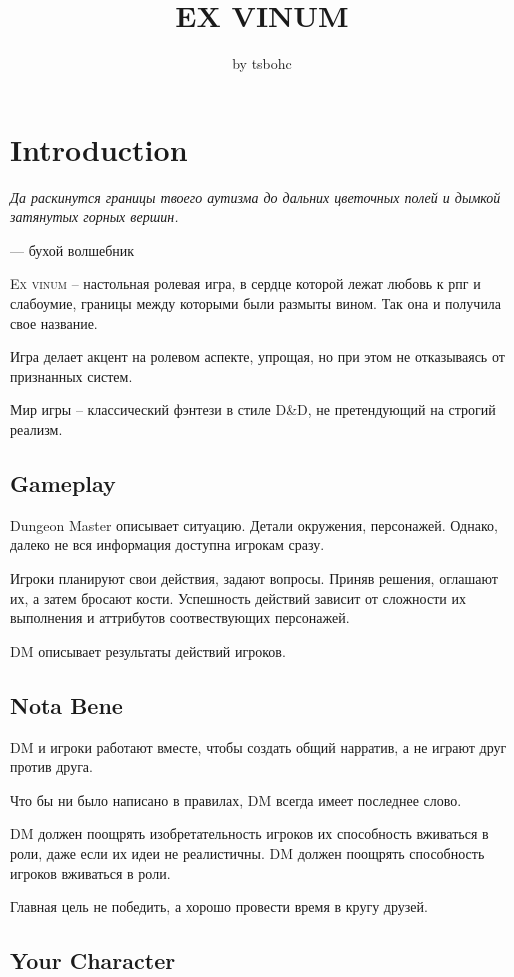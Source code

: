 \documentclass[a4paper,12pt,twocolumn]{book}
\title{\textbf{EX VINUM}}
\author{by tsbohc}
\date{}
\begin{document}
\maketitle
\tableofcontents

\chapter{Introduction}
\epigraph{\emph{Да раскинутся границы твоего аутизма до дальних цветочных полей и дымкой затянутых горных вершин.}}{--- бухой волшебник}

\lettrine{E}{x vinum} -- настольная ролевая игра, в сердце которой лежат любовь к рпг и слабоумие, границы между которыми были размыты вином. Так она и получила свое название.

Игра делает акцент на ролевом аспекте, упрощая, но при этом не отказываясь от признанных систем.

Мир игры -- классический фэнтези в стиле D\&D, не претендующий на строгий реализм.

\section{Gameplay}
Dungeon Master описывает ситуацию. Детали окружения, персонажей. Однако, далеко не вся информация доступна игрокам сразу.

Игроки планируют свои действия, задают вопросы. Приняв решения, оглашают их, а затем бросают кости. Успешность действий зависит от сложности их выполнения и аттрибутов соотвествующих персонажей.

DM описывает результаты действий игроков.

\section{Nota Bene}
DM и игроки работают вместе, чтобы создать общий нарратив, а не играют друг против друга.

Что бы ни было написано в правилах, DM всегда имеет последнее слово.

DM должен поощрять изобретательность игроков их способность вживаться в роли, даже если их идеи не реалистичны. DM должен поощрять способность игроков вживаться в роли.

Главная цель не победить, а хорошо провести время в кругу друзей.

\section{Your Character}
\end{document}
